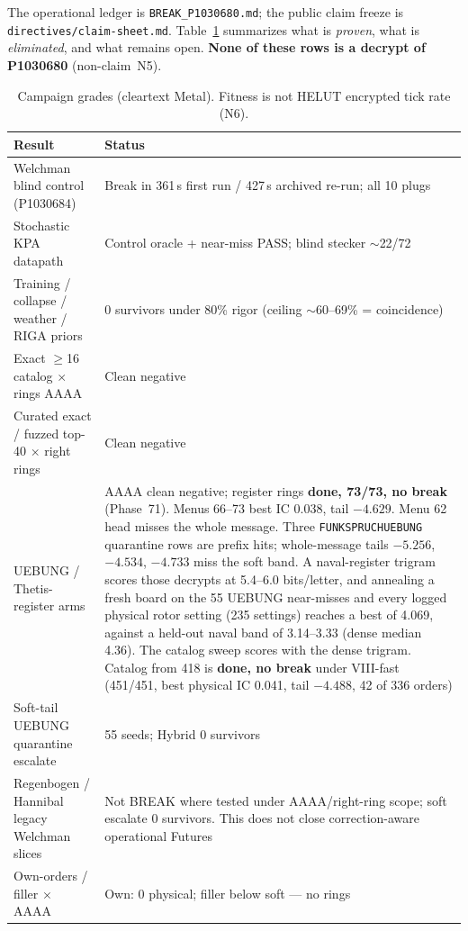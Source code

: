 \documentclass[11pt,a4paper]{article}
\begin{document}
The operational ledger is \texttt{BREAK\_P1030680.md}; the public claim
freeze is \texttt{directives/claim-sheet.md}.
Table~\ref{tab:campaign} summarizes what is \emph{proven}, what is
\emph{eliminated}, and what remains open.
\textbf{None of these rows is a decrypt of P1030680} (non-claim~N5).

{\small
\begin{longtable}{@{}p{}p{}@{}}
\caption{Campaign grades (cleartext Metal). Fitness is not HELUT encrypted tick rate (N6).}
\label{tab:campaign}\\
\toprule
\textbf{Result} & \textbf{Status} \\
\midrule
Welchman blind control (P1030684) & Break in 361\,s first run / 427\,s archived re-run; all 10 plugs \\
Stochastic KPA datapath & Control oracle + near-miss PASS; blind stecker $\sim$22/72 \\
Training / collapse / weather / RIGA priors & 0 survivors under 80\% rigor (ceiling $\sim$60--69\% = coincidence) \\
Exact $\ge$16 catalog $\times$ rings AAAA & Clean negative \\
Curated exact / fuzzed top-40 $\times$ right rings & Clean negative \\
UEBUNG / Thetis-register arms & AAAA clean negative; register rings \textbf{done, 73/73, no break} (Phase~71). Menus 66--73 best IC 0.038, tail $-4.629$. Menu 62 head misses the whole message. Three \texttt{FUNKSPRUCHUEBUNG} quarantine rows are prefix hits; whole-message tails $-5.256$, $-4.534$, $-4.733$ miss the soft band. A naval-register trigram scores those decrypts at 5.4--6.0 bits/letter, and annealing a fresh board on the 55 UEBUNG near-misses and every logged physical rotor setting (235 settings) reaches a best of 4.069, against a held-out naval band of 3.14--3.33 (dense median 4.36). The catalog sweep scores with the dense trigram. Catalog from 418 is \textbf{done, no break} under VIII-fast (451/451, best physical IC 0.041, tail $-4.488$, 42 of 336 orders) \\
Soft-tail UEBUNG quarantine escalate & 55 seeds; Hybrid 0 survivors \\
Regenbogen / Hannibal legacy Welchman slices & Not BREAK where tested under AAAA/right-ring scope; soft escalate 0 survivors. This does not close correction-aware operational Futures \\
Own-orders / filler $\times$ AAAA & Own: 0 physical; filler below soft --- no rings \\

\end{longtable}}
\end{document}
